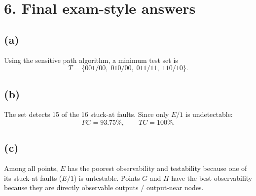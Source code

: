 \documentclass[11pt,a4paper]{article}
\begin{document}
\section*{6. Final exam-style answers}
\subsection*{(a)}
Using the sensitive path algorithm, a minimum test set is
\[
\boxed{T=\{001/00,\;010/00,\;011/11,\;110/10\}.}
\]

\subsection*{(b)}
The set detects 15 of the 16 stuck-at faults. Since only $E/1$ is undetectable:
\[
\boxed{FC=93.75\%,\qquad TC=100\%.}
\]

\subsection*{(c)}
Among all points, $E$ has the poorest observability and testability because one of its stuck-at faults ($E/1$) is untestable. Points $G$ and $H$ have the best observability because they are directly observable outputs / output-near nodes.
\end{document}
